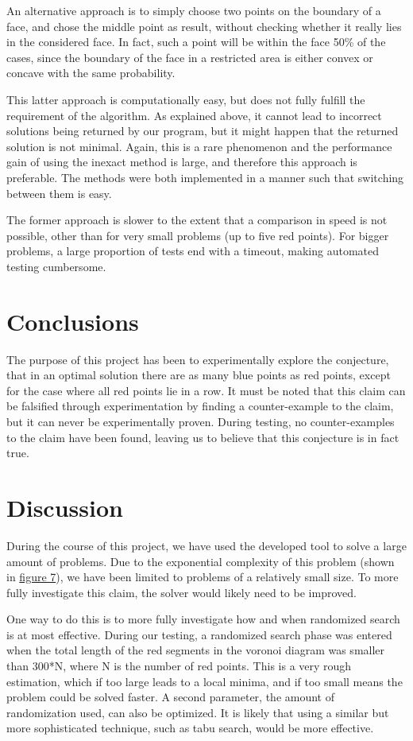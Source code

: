 \documentclass[a4paper,12pt]{article}
\begin{document}
An alternative approach is to simply choose two points on the boundary of a face, and chose the middle point as result, without checking whether it really lies in the considered face. In fact, such a point will be within the face 50\% of the cases, since the boundary of the face in a restricted area is either convex or concave with the same probability. 

This latter approach is computationally easy, but does not fully fulfill the requirement of the algorithm. As explained above, it cannot lead to incorrect solutions being returned by our program, but it might happen that the returned solution is not minimal. Again, this is a rare phenomenon and the performance gain of using the inexact method is large, and therefore this approach is preferable. The methods were both implemented in a manner such that switching between them is easy.

The former approach is slower to the extent that a comparison in speed is not possible, other than for very small problems (up to five red points). For bigger problems, a large proportion of tests end with a timeout, making automated testing cumbersome.


\section{Conclusions}
The purpose of this project has been to experimentally explore the conjecture, that in an optimal solution there are as many blue points as red points, except for the case where all red points lie in a row. It must be noted that this claim can be falsified through experimentation by finding a counter-example to the claim, but it can never be experimentally proven. During testing, no counter-examples to the claim have been found, leaving us to believe that this conjecture is in fact true.

\section{Discussion}
During the course of this project, we have used the developed tool to solve a large amount of problems. Due to the exponential complexity of this problem (shown in \hyperref[ref:speed] {figure 7}), we have been limited to problems of a relatively small size. To more fully investigate this claim, the solver would likely need to be improved.

One way to do this is to more fully investigate how and when randomized search is at most effective. During our testing, a randomized search phase was entered when the total length of the red segments in the voronoi diagram was smaller than 300*N, where N is the number of red points. This is a very rough estimation, which if too large leads to a local minima, and if too small means the problem could be solved faster. A second parameter, the amount of randomization used, can also be optimized. It is likely that using a similar but more sophisticated technique, such as tabu search, would be more effective.
\end{document}
